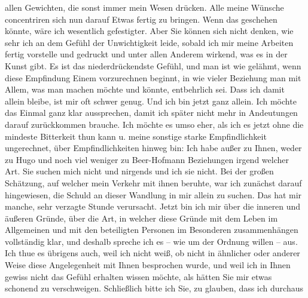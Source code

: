 \begin{ledgroupsized}[t]{13cm}
               allen Gewichten, die sonst immer mein Wesen drücken. Alle meine Wünsche concentriren
               sich nun darauf Etwas fertig zu bringen. Wenn das geschehen könnte, wäre ich
               wesentlich gefestigter. Aber Sie können sich nicht denken, wie sehr ich an dem Gefühl
               der Unwichtigkeit leide, sobald ich mir meine {\pb}Arbeiten fertig vorstelle und
               gedruckt und unter allen Anderem wirkend, was es in der Kunst gibt. Es ist das
               niederdrückendste Gefühl, und man ist wie gelähmt, wenn diese Empfindung Einem
               vorzurechnen beginnt, in wie vieler Beziehung man mit Allem, was man machen möchte
               und könnte, entbehrlich sei. Dass ich damit allein bleibe, ist mir oft schwer genug.
               Und ich bin jetzt ganz allein. Ich möchte das Einmal ganz klar aussprechen, damit ich
               später nicht mehr in Andeutungen darauf zurückkommen brauche. Ich möchte es umso
               eher, als ich es jetzt ohne die mindeste Bitterkeit thun kann u. meine sonstige
               starke Empfindlichkeit ungerechnet, über Empfindlichkeiten hinweg bin: Ich habe außer
               zu Ihnen, weder zu Hugo und noch viel weniger
               zu Beer-Hofmann Beziehungen irgend welcher
               Art. Sie suchen mich nicht und nirgends und ich sie nicht. {\pb}Bei der großen Schätzung, auf
               welcher mein Verkehr mit ihnen beruhte, war ich zunächst darauf hingewiesen, die
               Schuld an dieser Wandlung in mir allein zu suchen. Das hat mir manche, sehr verzagte
               Stunde verursacht. Jetzt bin ich mir über die inneren und äußeren Gründe, über die
               Art, in welcher diese Gründe mit dem Leben im Allgemeinen und mit den \introOben{}beteiligten\introOben{} Personen im Besonderen zusammenhängen vollständig
               klar, und deshalb spreche ich es – wie um der Ordnung willen – aus. Ich thue \introOben{}es\introOben{} übrigens auch, weil ich nicht weiß, ob nicht in ähnlicher
               oder anderer Weise diese Angelegenheit mit Ihnen besprochen wurde, und weil ich in
               Ihnen gewiss nicht das Gefühl erhalten wissen möchte, als hätten Sie mir etwas
               schonend zu verschweigen. Schließlich bitte ich Sie, zu glauben, dass ich durchaus

\end{ledgroupsized}

